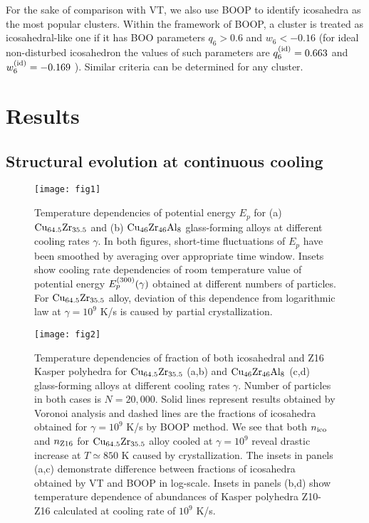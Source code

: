 \documentclass[jcp,twocolumn,superscriptaddress,floatfix,graphicx,showpacs]{revtex4-1}
\begin{document}
For the sake of comparison with VT,  we also use BOOP to identify icosahedra as the most popular clusters.  Within the framework of BOOP, a cluster is treated as icosahedral-like one if it has BOO parameters $q_6 > 0.6$ and $w_6 < -0.16$ (for ideal non-disturbed icosahedron the values of such parameters are $q_6^{\rm (id)} = 0.663$ and $w_6^{\rm (id)} = -0.169$ ). Similar criteria can be determined for any cluster.


\section{Results}

\subsection{Structural evolution at continuous cooling}

 \begin{figure}
  \centering
  \texttt{[image: fig1]}\\
  \caption{ Temperature dependencies of potential energy $E_p$ for (a) ${\rm Cu_{64.5}Zr_{35.5}}$ and (b) ${\rm Cu_{46}Zr_{46}Al_{8}}$ glass-forming alloys at different cooling rates $\gamma$. In both figures, short-time fluctuations of $E_p$ have been smoothed by averaging over appropriate time window. Insets show cooling rate dependencies of room temperature value of potential energy $E^{\rm(300)}_{p}(\gamma)$ obtained at different numbers of particles. For ${\rm Cu_{64.5}Zr_{35.5}}$ alloy, deviation of this dependence from logarithmic law at $\gamma=10^{9}$ K/s is caused by partial crystallization.}
  \label{fig:Ept}
\end{figure}


\begin{figure}
  \centering
  \texttt{[image: fig2]}\\
  \caption{ Temperature dependencies of fraction of both icosahedral and Z16 Kasper polyhedra for ${\rm Cu_{64.5}Zr_{35.5}}$ (a,b)  and  ${\rm Cu_{46}Zr_{46}Al_{8}}$ (c,d) glass-forming alloys at different cooling rates $\gamma$. Number of particles in both cases is $N=20,000$. Solid lines represent results obtained by Voronoi analysis and dashed lines are the fractions of icosahedra obtained for $\gamma=10^9$ K/s by BOOP method.  We see that both $n_{\rm ico}$ and $n_{\rm Z16}$ for ${\rm Cu_{64.5}Zr_{35.5}}$ alloy cooled at $\gamma=10^9$ reveal drastic increase at $T \simeq 850$ K caused by crystallization. The insets in panels (a,c) demonstrate difference between fractions of icosahedra obtained by VT and BOOP in log-scale. Insets in panels (b,d) show temperature dependence of abundances of Kasper polyhedra Z10-Z16 calculated at cooling rate of $10^{9} $ K/s.}
  \label{fig:ico}
\end{figure}
\end{document}
